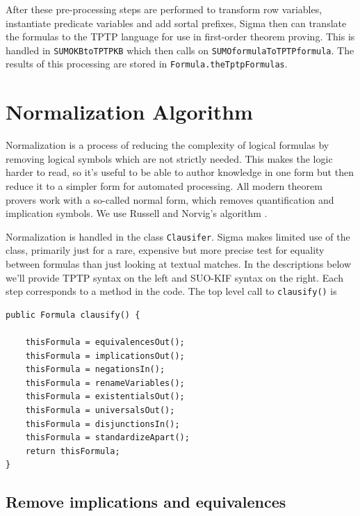 \documentclass{book}
\begin{document}
After these pre-processing steps are performed to transform row variables, instantiate
predicate variables and add sortal prefixes, Sigma then can translate the formulas
to the TPTP language for use in first-order theorem proving.  This is handled in
\texttt{SUMOKBtoTPTPKB} which then calls on \texttt{SUMOformulaToTPTPformula}.  The
results of this processing are stored in \texttt{Formula.theTptpFormulas}.


\section{Normalization Algorithm}
\label{chap:SUMOInfe:sec:Norm}

Normalization is a process of reducing the complexity of logical formulas by
removing logical symbols which are not strictly needed.  This makes the logic
harder to read, so it's useful to be able to author knowledge in one form but
then reduce it to a simpler form for automated processing.  All modern theorem
provers work with a so-called normal form, which removes quantification and
implication symbols.  We use Russell and Norvig's algorithm \cite{RN:AI-2009}.

Normalization is handled in the class
\texttt{Clausifer}. Sigma makes limited use of the
class, primarily just for a rare, expensive but more precise test for equality
between formulas than just looking at textual matches.  In the descriptions
below we'll provide TPTP syntax on the left and SUO-KIF syntax on the right.
Each step corresponds to a method in the code.  The top level call to
\texttt{clausify()} is

\begin{lstlisting}[basicstyle=\ttfamily\small\bfseries]
public Formula clausify() {

    thisFormula = equivalencesOut();
    thisFormula = implicationsOut();
    thisFormula = negationsIn();
    thisFormula = renameVariables();
    thisFormula = existentialsOut();
    thisFormula = universalsOut();
    thisFormula = disjunctionsIn();
    thisFormula = standardizeApart();
    return thisFormula;
}
\end{lstlisting}

\subsection{Remove implications and equivalences}
			
\end{document}
